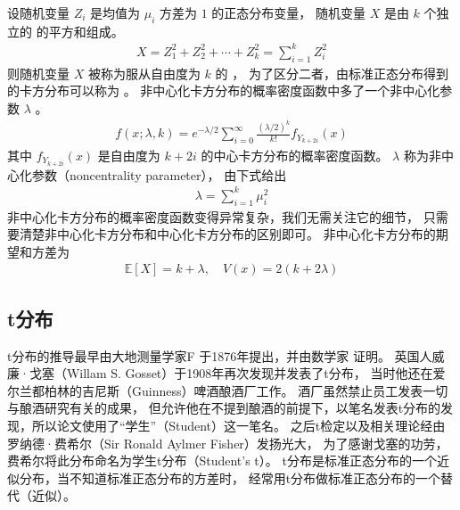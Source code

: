 \documentclass[letterpaper,10pt,english]{sphinxmanual}
\begin{document}
设随机变量 \(Z_i\) 是均值为 \(\mu_i\) 方差为 \(1\) 的正态分布变量，
随机变量 \(X\) 是由 \(k\) 个独立的  的平方和组成。
\begin{equation}\label{equation:概率基础/content:概率基础/content:78}
\begin{split}X = Z_1^2 + Z_2^2 + \cdots + Z_k^2 = \sum_{i=1}^k  Z_i^2\end{split}
\end{equation}
则随机变量 \(X\) 被称为服从自由度为 \(k\) 的 ，
为了区分二者，由标准正态分布得到的卡方分布可以称为 。
非中心化卡方分布的概率密度函数中多了一个非中心化参数 \(\lambda\)
。
\begin{equation}\label{equation:概率基础/content:概率基础/content:79}
\begin{split}f(x;\lambda,k) = e^{-\lambda/2} \sum_{i=0}^{\infty}
\frac{(\lambda/2)^k }{k!} f_{Y_{k+2i}}(x)\end{split}
\end{equation}
其中 \(f_{Y_{k+2i}}(x)\) 是自由度为 \(k+2i\) 的中心卡方分布的概率密度函数。
\(\lambda\) 称为非中心化参数（non\sphinxhyphen{}centrality parameter），
由下式给出
\begin{equation}\label{equation:概率基础/content:概率基础/content:80}
\begin{split}\lambda = \sum_{i=1}^k \mu_i^2\end{split}
\end{equation}
非中心化卡方分布的概率密度函数变得异常复杂，我们无需关注它的细节，
只需要清楚非中心化卡方分布和中心化卡方分布的区别即可。
非中心化卡方分布的期望和方差为
\begin{equation}\label{equation:概率基础/content:概率基础/content:81}
\begin{split}\mathbb{E}[X] = k+\lambda, \quad V(x) = 2(k+2\lambda)\end{split}
\end{equation}

\subsection{t分布}
\label{\detokenize{_u6982_u7387_u57fa_u7840/content:t}}\label{\detokenize{_u6982_u7387_u57fa_u7840/content:ch-probability-t}}
t分布的推导最早由大地测量学家F  于1876年提出，并由数学家  证明。
英国人威廉·戈塞（Willam S. Gosset）于1908年再次发现并发表了t分布，
当时他还在爱尔兰都柏林的吉尼斯（Guinness）啤酒酿酒厂工作。
酒厂虽然禁止员工发表一切与酿酒研究有关的成果，
但允许他在不提到酿酒的前提下，以笔名发表t分布的发现，所以论文使用了“学生”（Student）这一笔名。
之后t检定以及相关理论经由罗纳德·费希尔（Sir Ronald Aylmer Fisher）发扬光大，
为了感谢戈塞的功劳，费希尔将此分布命名为学生t分布（Student’s t）。
t分布是标准正态分布的一个近似分布，当不知道标准正态分布的方差时，
经常用t分布做标准正态分布的一个替代（近似）。
\end{document}
